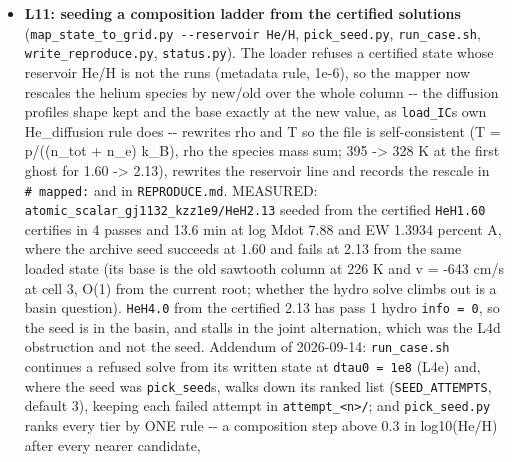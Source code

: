\documentclass[english,a4paper]{my_memo}
\begin{document}
\begin{itemize}
  with the \texttt{\_adv} composition against 15.5 with the solution\textquotesingle s composition
  (temperature is 0.15 percent of the EW, composition a factor 13), so the
  He 2\^{}3S column and the crossing He/H stand on the ionization closure and
  not on the hydrodynamics -\/- which is what opened item L12. Reported out of
  scope: the same \texttt{info\ /=\ 1} discard in the advected-ionization and metal
  re-solve branches, and the Brent window {[}0.05, 4{]} x T\_in and the metals-on
  MINPACK band {[}0.5, 2{]} x T\_in, which above 16 to 33 R\_p remove the
  correction altogether.
\item
  \textbf{L11: seeding a composition ladder from the certified solutions}
  (\texttt{map\_state\_to\_grid.py\ -\/-reservoir\ He/H}, \texttt{pick\_seed.py}, \texttt{run\_case.sh},
  \texttt{write\_reproduce.py}, \texttt{status.py}). The loader refuses a certified state
  whose reservoir He/H is not the run\textquotesingle s (metadata rule, 1e-6), so the mapper
  now rescales the helium species by new/old over the whole column -\/- the
  diffusion profile\textquotesingle s shape kept and the base exactly at the new value, as
  \texttt{load\_IC}\textquotesingle s own He\_diffusion rule does -\/- rewrites rho and T so the file is
  self-consistent (T = p/((n\_tot + n\_e) k\_B), rho the species mass sum; 395
  -\textgreater{} 328 K at the first ghost for 1.60 -\textgreater{} 2.13), rewrites the reservoir line
  and records the rescale in \texttt{\#\ mapped:} and in \texttt{REPRODUCE.md}. MEASURED:
  \texttt{atomic\_scalar\_gj1132\_kzz1e9/HeH2.13} seeded from the certified \texttt{HeH1.60}
  certifies in 4 passes and 13.6 min at log Mdot 7.88 and EW 1.3934 percent
  A, where the archive seed succeeds at 1.60 and fails at 2.13 from the same
  loaded state (its base is the old sawtooth column at 226 K and v = -643
  cm/s at cell 3, O(1) from the current root; whether the hydro solve climbs
  out is a basin question). \texttt{HeH4.0} from the certified 2.13 has pass 1 hydro
  \texttt{info\ =\ 0}, so the seed is in the basin, and stalls in the joint
  alternation, which was the L4d obstruction and not the seed. Addendum of
  2026-09-14: \texttt{run\_case.sh} continues a refused solve from its written state
  at \texttt{dtau0\ =\ 1e8} (L4e) and, where the seed was \texttt{pick\_seed}\textquotesingle s, walks down its
  ranked list (\texttt{SEED\_ATTEMPTS}, default 3), keeping each failed attempt in
  \texttt{attempt\_\textless{}n\textgreater{}/}; and \texttt{pick\_seed.py} ranks every tier by ONE rule -\/- a
  composition step above 0.3 in log10(He/H) after every nearer candidate,

\end{itemize}
\end{document}
